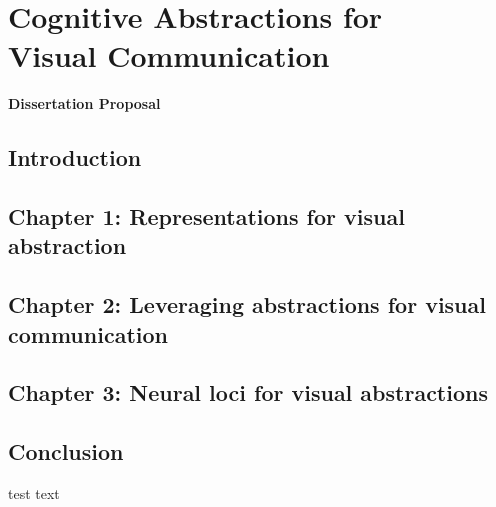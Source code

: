 \documentclass{Dissertate}
\begin{document}
\chapter*{\centering Cognitive Abstractions for \\ Visual Communication}

{\centering \large \textbf{Dissertation Proposal} \par}


\section*{Introduction}

\section*{Chapter 1: Representations for visual abstraction}

\section*{Chapter 2: Leveraging abstractions for visual communication }

\section*{Chapter 3: Neural loci for visual abstractions}

\section*{Conclusion}
test text \cite{Knuth1968}





% 
\end{document}
